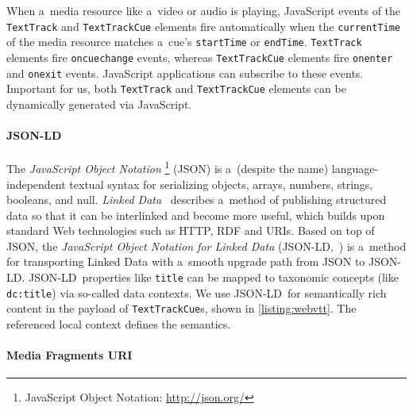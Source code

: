 \documentclass{sig-alternate}
\newcommand{\inlinelistingsize}{\fontsize{8pt}{11pt}}
\let\oldurl\url
\renewcommand{\url}[1]{\inlinelistingsize\oldurl{#1}}
\def\JSONLD{\mbox{JSON-LD}}
\begin{document}
When a~media resource like a~video or audio is playing,
JavaScript events of the \texttt{TextTrack} and \texttt{TextTrackCue}
elements fire automatically when the \texttt{currentTime}
of the media resource matches
a~cue's \texttt{startTime} or \texttt{endTime}.
\texttt{TextTrack} elements fire \texttt{oncuechange} events,
whereas \texttt{TextTrackCue} elements fire
\texttt{onenter} and \texttt{onexit} events.
JavaScript applications can subscribe to these events.
Important for us, both \texttt{TextTrack} and
\texttt{TextTrackCue} elements
can be dynamically generated via JavaScript.

\paragraph{\JSONLD}

The \emph{JavaScript Object Notation}%
\footnote{JavaScript Object Notation: \url{http://json.org/}}
(JSON)
is a~(despite the name) language-independent textual syntax
for serializing objects, arrays, numbers, strings, booleans, and null.
\emph{Linked Data}~\cite{bizer2009linkeddata}
describes a~method of publishing structured data
so that it can be interlinked and become more useful,
which builds upon standard Web technologies such as HTTP, RDF and URIs.
Based on top of JSON, the
\emph{JavaScript Object Notation for Linked Data}
(\JSONLD,~\cite{sporny2013jsonld}) is a~method for transporting
Linked Data with a~smooth upgrade path from JSON to \JSONLD.
\JSONLD~properties like \texttt{title} can be mapped to taxonomic
concepts (like \texttt{dc:title}) via so-called data contexts.
We use \JSONLD\ for semantically rich content
in the payload of \texttt{TextTrackCue}s, shown in
\autoref{listing:webvtt}.
The referenced local context defines the semantics.

\paragraph{Media Fragments URI}
\end{document}
